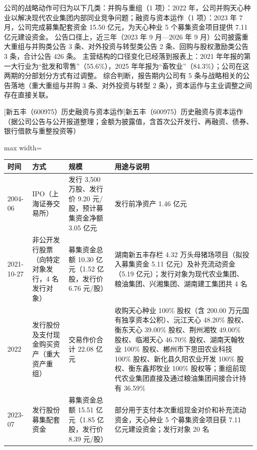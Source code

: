  公司的战略动作可归为以下几类：并购与重组（1 项）：2022 年，公司并购天心种业以解决现代农业集团内部同业竞争问题；融资与资本运作（1 项）：2023 年 7 月，公司完成募集配套资金 15.50 亿元，为天心种业 5 个募集资金项目提供 7.11 亿元建设资金。 公告口径上，近三年（2023 年 9 月---2026 年 9 月）公司披露重大重组与并购类公告 3 条、对外投资与转型类公告 2 条、回购与股权激励类公告 3 条，合计公告 426 条。 主营结构的口径变化已经落到报表上：2021 年年报的第一大行业为“批发和零售”（55.6\%），2025 年年报为“畜牧业”（84.3\%）；公司在这两期的分部划分方式有过调整。 综合判断，报告期内公司有 5 条与战略相关的公告落地（重大重组与并购 3 条、对外投资与转型 2 条），资本运作与主业调整之间存在直接关联。

\begin{center}\small\setlength{\tabcolsep}{4pt}
[新五丰（600975）历史融资与资本运作]{新五丰（600975）历史融资与资本运作（据公司公告与公开报道整理；金额为披露值，含首次公开发行、再融资、债券、银行借款与重整投资等）}
\begin{adjustbox}{max width=\textwidth}
\begin{tabular}{@{}p{1.45cm}p{2.55cm}p{4.05cm}p{4.95cm}@{}}
\toprule
时间 & 方式 & 规模 & 用途与说明 \\
\midrule
2004-06 & IPO（上海证券交易所） & 发行 3,\allowbreak{}500 万股、\allowbreak{}发行价 9.20 元/\allowbreak{}股，\allowbreak{}预计募集资金净额 3.05 亿元 & 发行前净资产 1.46 亿元 \\
2021-10-27 & 非公开发行股票（向特定对象发行，4 名发行对象） & 募集资金总额 10.30 亿元（1.52 亿股，\allowbreak{}发行价 6.76 元/\allowbreak{}股） & 湖南新五丰存栏 4.32 万头母猪场项目（拟投入募集资金 5.11 亿元）及补充流动资金（5.19 亿元）；发行对象为现代农业集团、\allowbreak{}粮油集团、\allowbreak{}兴湘集团、\allowbreak{}湖南建工集团共 4 名 \\
2022 & 发行股份及支付现金购买资产（重大资产重组） & 交易作价合计 22.08 亿元 & 收购天心种业 100\% 股权（含 200.00 万元国有独享资本公积）、\allowbreak{}沅江天心 48.20\% 股权、\allowbreak{}衡东天心 39.00\% 股权、\allowbreak{}荆州湘牧 49.00\% 股权、\allowbreak{}临湘天心 46.70\% 股权、\allowbreak{}湖南天翰牧业 100\% 股权、\allowbreak{}郴州市下思田农业科技 100\% 股权、\allowbreak{}新化县久阳农业开发 100\% 股权、\allowbreak{}衡东鑫邦牧业 100\% 股权等；重组前现代农业集团直接及通过粮油集团间接合计持有 36.59\% \\
2023-07 & 发行股份募集配套资金 & 募集资金总额 15.51 亿元（1.85 亿股，\allowbreak{}发行价 8.39 元/\allowbreak{}股） & 部分用于支付本次重组现金对价和补充流动资金，\allowbreak{}天心种业 5 个募集资金项目获 7.11 亿元建设资金；发行对象 20 名 \\
\bottomrule
\end{tabular}
\end{adjustbox}
\end{center}

